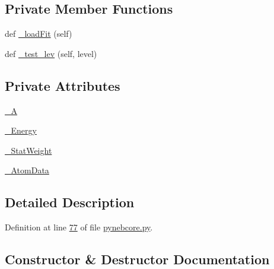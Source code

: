 \subsection*{Private Member Functions}
\begin{DoxyCompactItemize}
\item 
def \hyperlink{classpyneb_1_1core_1_1pynebcore_1_1___atom_data_fits_a5011cd6c231d6fdbedb29d91615a3d4d}{\+\_\+load\+Fit} (self)
\item 
def \hyperlink{classpyneb_1_1core_1_1pynebcore_1_1___atom_data_fits_ae83c63a7bd651275de23e5f17ddcf999}{\+\_\+test\+\_\+lev} (self, level)
\end{DoxyCompactItemize}
\subsection*{Private Attributes}
\begin{DoxyCompactItemize}
\item 
\hyperlink{classpyneb_1_1core_1_1pynebcore_1_1___atom_data_fits_a84351f8e5bae7c23f1318fe9464db1ca}{\+\_\+\+A}
\item 
\hyperlink{classpyneb_1_1core_1_1pynebcore_1_1___atom_data_fits_a465451be78113fc2ee30cf3ddabceadf}{\+\_\+\+Energy}
\item 
\hyperlink{classpyneb_1_1core_1_1pynebcore_1_1___atom_data_fits_a8bee4fc914c9542b85e4750eb63b7aa0}{\+\_\+\+Stat\+Weight}
\item 
\hyperlink{classpyneb_1_1core_1_1pynebcore_1_1___atom_data_fits_a778ab4d0dcd50a9d2f5aa54da07b51cc}{\+\_\+\+Atom\+Data}
\end{DoxyCompactItemize}


\subsection{Detailed Description}


Definition at line \hyperlink{pynebcore_8py_source_l00077}{77} of file \hyperlink{pynebcore_8py_source}{pynebcore.\+py}.



\subsection{Constructor \& Destructor Documentation}
\hypertarget{classpyneb_1_1core_1_1pynebcore_1_1___atom_data_fits_a626724a08fd24ba2ea2b44307ec6b294}{}
